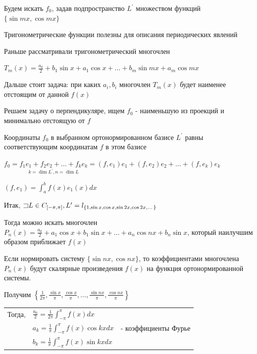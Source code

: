 \documentclass[12pt]{article}
\begin{document}
    Будем искать $f_0$, задав подпространство $L^\prime$ множеством функций $\{\sin mx, \cos mx\}$

    Тригонометрические функции полезны для описания периодических явлений

    Раньше рассматривали тригонометрический многочлен

    $T_m(x) = \frac{a_0}{2} + b_1 \sin x + a_1 \cos x + \dots + b_m \sin mx + a_m \cos mx$

    Дальше стоит задача: при каких $a_i, b_i$ многочлен $T_m(x)$ будет наименее отстоящим от данной $f(x)$



    \Mem Решаем задачу о перпендикуляре, ищем $f_0$ - наименьшую из проекций и минимально отстоящую от $f$

    Координаты $f_0$ в выбранном ортонормированном базисе $L^\prime$ равны соответствующим координатам $f$ в этом базисе

    $f_0 = \underset{k = \dim L^\prime, n = \dim L}{f_1 e_1 + f_2 e_2 + \dots + f_k e_k} = 
    (f, e_1) e_1 + (f, e_2) e_2 + \dots + (f, e_k) e_k$

    $(f, e_1) = \int_a^b f(x) e_1(x) dx$

    \Nota Итак, $\mathord{\sqsupset} L \in C_{[-\pi, \pi]}, L^\prime = l_{\{1, \sin x, \cos x, \sin 2x, \cos 2x, \dots\}}$

    Тогда можно искать многочлен $P_n(x) = \frac{a_0}{2} + a_1 \cos x + b_1 \sin x + \dots + a_n \cos nx + b_n \sin x$, который
    наилучшим образом приближает $f(x)$

    Если нормировать систему $\{\sin nx, \cos nx\}$, то коэффициентами многочлена $P_n(x)$ будут скалярные произведения
    $f(x)$ на функция ортонормированной системы. 
    
    Получим $\left\{\frac{1}{2\pi}, \frac{\sin x}{\pi}, \frac{\cos x}{\pi}, \dots, \frac{\sin nx}{\pi}, \frac{\cos nx}{\pi}\right\}$

    {
        \begin{tabular}{l|l|l}
            \cline{2-2}
            Тогда, & $\frac{a_0}{2} = \frac{1}{2\pi} \int_{-\pi}^\pi f(x) dx$ & \\
            & $a_k = \frac{1}{\pi} \int_{-\pi}^\pi f(x) \cos kx dx$ & - коэффициенты Фурье \\
            & $b_k = \frac{1}{\pi} \int_{-\pi}^\pi f(x) \sin kx dx$ & \\
            \cline{2-2}
        \end{tabular}
    }
\end{document}
